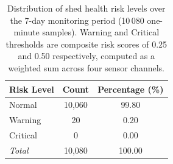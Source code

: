 \begin{table}[htbp]
  \centering
  \caption{Distribution of shed health risk levels over the 7-day monitoring period
           (10\,080 one-minute samples). Warning and Critical thresholds are
           composite risk scores of 0.25 and 0.50 respectively, computed as a
           weighted sum across four sensor channels.}
  \label{tab:ai_risk_distribution}
  \begin{tabular}{lcc}
    \hline
    \textbf{Risk Level} & \textbf{Count} & \textbf{Percentage (\%)} \\
    \hline
  Normal & 10,060 & 99.80 \\
  Warning & 20 & 0.20 \\
  Critical & 0 & 0.00 \\
    \hline
    \textit{Total} & 10,080 & 100.00 \\
    \hline
  \end{tabular}
\end{table}
